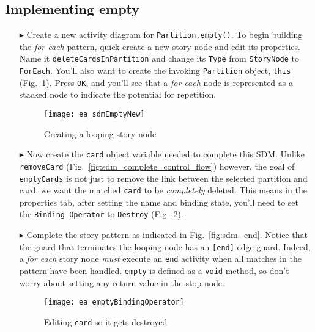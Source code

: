 \newpage
\hypertarget{emptyPartition vis}{}
\subsection{Implementing empty}
\visHeader

\begin{itemize}

\item[$\blacktriangleright$] Create a new activity diagram for \texttt{Partition.empty()}. To begin building the \emph{for each} pattern, quick create a new
story node and edit its properties. Name it \texttt{deleteCardsInPartition} and change its \texttt{Type} from \texttt{StoryNode} to \texttt{ForEach}. You'll
also want to create the invoking \texttt{Partition} object, \texttt{this} (Fig.~\ref{fig:sdm_foreach}). Press \texttt{OK}, and you'll see that a \emph{for each} node is
represented as a stacked node to indicate the potential for repetition.

\begin{figure}[htbp]
\begin{center}
  \texttt{[image: ea\_sdmEmptyNew]}
  \caption{Creating a looping story node}  
  \label{fig:sdm_foreach}
\end{center}
\end{figure}

\item[$\blacktriangleright$] Now create the \texttt{card} object variable needed to complete this SDM. Unlike \texttt{removeCard}
(Fig.~\ref{fig:sdm_complete_control_flow}) however, the goal of \texttt{emptyCards} is not just to remove the link between the selected partition and card, we
want the matched \texttt{card} to be \emph{completely} deleted. This means in the properties tab, after setting the name and binding state, you'll need to set
the \texttt{Binding Operator} to \texttt{Destroy} (Fig.~\ref{fig:sdm_bindingOperator}).

\item[$\blacktriangleright$] Complete the story pattern as indicated in Fig.~\ref{fig:sdm_end}. Notice that the guard that terminates the looping node has an
\texttt{[end]} edge guard. Indeed, a \emph{for each} story node \emph{must} execute an \texttt{end} activity when all matches in the pattern have been
handled. \texttt{empty} is defined as a \texttt{void} method, so don't worry about setting any return value in the stop node.

\begin{figure}[htbp]
\begin{center}
  \texttt{[image: ea\_emptyBindingOperator]}
  \caption{Editing \texttt{card} so it gets destroyed}  
  \label{fig:sdm_bindingOperator}
\end{center}
\end{figure}


\end{itemize}
